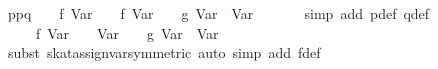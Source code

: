\begin{isabellebody}
\ {}p{}{}{}p{}{}{}q{}{}{}\ {}\ {}\ {}{}\ f\ {}Var\ {}{}{}\ {}\ {}{}\ f\ {}Var\ {}{}{}\ {}\ {}{}\ g\ {}Var\ {}{}\ {}Var\ {}{}{}\isanewline
\ \ \ \ \isamarkupfalse%
\ {}simp\ add{}\ p{}def\ q{}def{}\isanewline
\ \ \isamarkupfalse%
\ \isamarkupfalse%
\ {}{}{}{}\ {}\ {}\ {}{}\ f\ {}Var\ {}{}{}\ {}\ {}{}\ Var\ {}{}\ {}\ {}{}\ g\ {}Var\ {}{}\ {}Var\ {}{}{}\isanewline
\ \ \ \ \isamarkupfalse%
\ {}subst\ skat{}assign{}{}var{}symmetric{}{}\ {}auto\ simp\ add{}\ f{}def{}\isanewline

\end{isabellebody}
